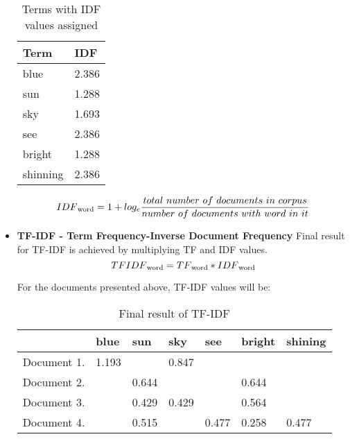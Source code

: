 \begin{itemize}
	
	\begin{table}[H]
		\centering
		\caption{Terms with IDF values assigned}
		\label{tf_idf_idf}
	\begin{tabular}{@{}ll@{}}
		\toprule
		Term     & IDF   \\ \midrule
		blue     & 2.386 \\
		sun      & 1.288 \\
		sky      & 1.693 \\
		see      & 2.386 \\
		bright   & 1.288 \\
		shinning & 2.386 \\ \bottomrule
	\end{tabular}
	\end{table}
	
		\[IDF\textsubscript{word}=1+log_e \frac{total\ number\ of\ documents\ in\ corpus}{number\ of\ documents\ with\ word\ in\ it}\]

	\item \textbf{TF-IDF - Term Frequency-Inverse Document Frequency}
	Final result for TF-IDF is achieved by multiplying TF and IDF values.
	\[TFIDF\textsubscript{word}=TF\textsubscript{word} * IDF\textsubscript{word}\]
	
	For the documents presented above, TF-IDF values will be:

	\begin{table}[H]
		\centering
		\caption{Final result of TF-IDF}
		\label{tf_idf}
		\begin{tabular}{lllllll}
			\hline
			& blue  & sun   & sky   & see   & bright & shining \\ \hline
			Document 1. & 1.193 &       & 0.847 &       &        &         \\
			Document 2. &       & 0.644 &       &       & 0.644  &         \\
			Document 3. &       & 0.429 & 0.429 &       & 0.564  &         \\
			Document 4. &       & 0.515 &       & 0.477 & 0.258  & 0.477   \\ \hline
		\end{tabular}
	\end{table}
	
\end{itemize}

